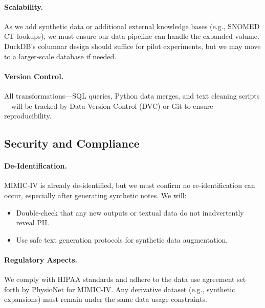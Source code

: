 \documentclass[12pt,a4paper]{report}
\begin{document}
\paragraph{Scalability.}
As we add synthetic data or additional external knowledge bases (e.g., SNOMED CT lookups), we must ensure our data pipeline can handle the expanded volume. DuckDB’s columnar design should suffice for pilot experiments, but we may move to a larger-scale database if needed.

\paragraph{Version Control.}
All transformations—SQL queries, Python data merges, and text cleaning scripts—will be tracked by Data Version Control (DVC) or Git to ensure reproducibility.

\subsection{Security and Compliance}

\paragraph{De-Identification.}
MIMIC-IV is already de-identified, but we must confirm no re-identification can occur, especially after generating synthetic notes. We will:
\begin{itemize}
    \item Double-check that any new outputs or textual data do not inadvertently reveal PII.
    \item Use safe text generation protocols for synthetic data augmentation.
\end{itemize}

\paragraph{Regulatory Aspects.}
We comply with HIPAA standards and adhere to the data use agreement set forth by PhysioNet for MIMIC-IV. Any derivative dataset (e.g., synthetic expansions) must remain under the same data usage constraints.
\end{document}
